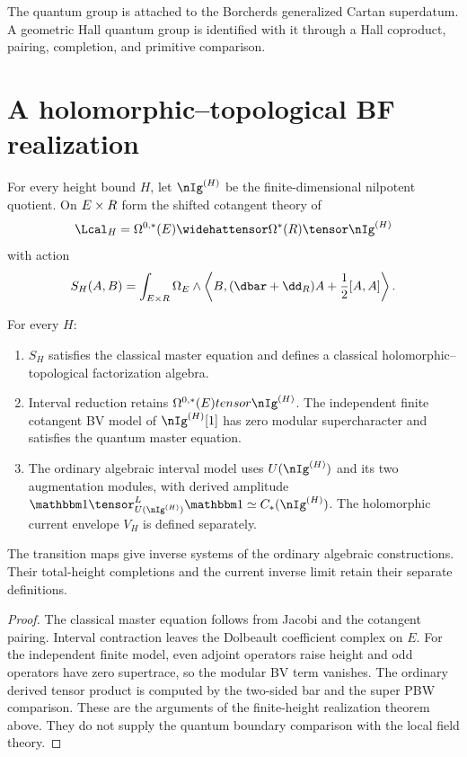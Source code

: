 \begin{remark}
The quantum group is attached to the Borcherds generalized Cartan superdatum.  A geometric Hall quantum group is identified with it through a Hall coproduct, pairing, completion, and primitive comparison.
\end{remark}

\chapter{A holomorphic--topological BF realization}
For every height bound $H$, let $\nIg^{(H)}$ be the finite-dimensional nilpotent quotient.  On $E\times R$ form the shifted cotangent theory of
\[
 \Lcal_H=\Omega^{0,*}(E)\widehattensor\Omega^*(\R)\tensor\nIg^{(H)}
\]
with action
\[
 S_H(A,B)=\int_{E\times\R}\Omega_E\wedge
 \left\langle B,(\dbar+\dd_{\R})A+\frac12[A,A]\right\rangle .
\]

\begin{theorem}
For every $H$:
\begin{enumerate}
\item $S_H$ satisfies the classical master equation and defines a classical holomorphic--topological factorization algebra.
\item Interval reduction retains $\Omega^{0,*}(E)\otimes\nIg^{(H)}$. The independent finite cotangent BV model of $\nIg^{(H)}[1]$ has zero modular supercharacter and satisfies the quantum master equation.
\item The ordinary algebraic interval model uses $U(\nIg^{(H)})$ and its two augmentation modules, with derived amplitude $\mathbbm1\tensor^{\mathbb L}_{U(\nIg^{(H)})}\mathbbm1\simeq C_*(\nIg^{(H)})$. The holomorphic current envelope $V_H$ is defined separately.
\end{enumerate}
The transition maps give inverse systems of the ordinary algebraic constructions. Their total-height completions and the current inverse limit retain their separate definitions.
\end{theorem}
\begin{proof}
The classical master equation follows from Jacobi and the cotangent pairing.
Interval contraction leaves the Dolbeault coefficient complex on $E$.
For the independent finite model, even adjoint operators raise height and odd operators have zero supertrace, so the modular BV term vanishes.
The ordinary derived tensor product is computed by the two-sided bar and the super PBW comparison.
These are the arguments of the finite-height realization theorem above.
They do not supply the quantum boundary comparison with the local field theory.
\end{proof}

